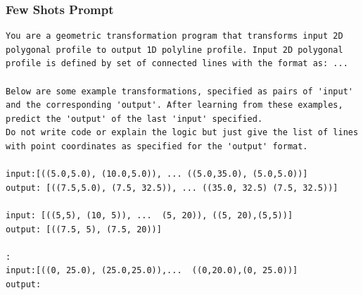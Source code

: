 \begin{frame}[fragile]\frametitle{Few Shots Prompt}
\begin{lstlisting}
You are a geometric transformation program that transforms input 2D polygonal profile to output 1D polyline profile. Input 2D polygonal profile is defined by set of connected lines with the format as: ...

Below are some example transformations, specified as pairs of 'input' and the corresponding 'output'. After learning from these examples, predict the 'output' of the last 'input' specified.
Do not write code or explain the logic but just give the list of lines with point coordinates as specified for the 'output' format.

input:[((5.0,5.0), (10.0,5.0)), ... ((5.0,35.0), (5.0,5.0))]
output: [((7.5,5.0), (7.5, 32.5)), ... ((35.0, 32.5) (7.5, 32.5))]

input: [((5,5), (10, 5)), ...  (5, 20)), ((5, 20),(5,5))]
output: [((7.5, 5), (7.5, 20))]

:
input:[((0, 25.0), (25.0,25.0)),...  ((0,20.0),(0, 25.0))]
output:
\end{lstlisting}	
\end{frame}





